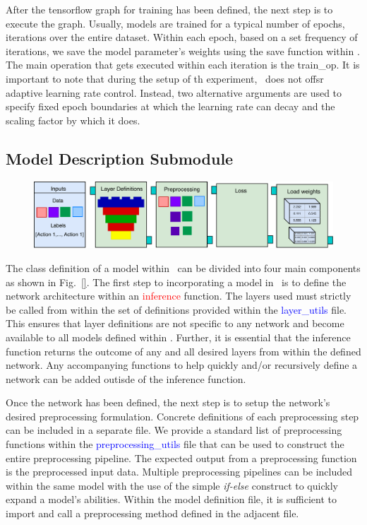 \documentclass{llncs}
\begin{document}
After the tensorflow graph for training has been defined, the next step is to execute the graph. 
Usually, models are trained for a typical number of epochs, iterations over the entire dataset.
Within each epoch, based on a set frequency of iterations, we save the model parameter's weights using the save function within \checkpoint.
The main operation that gets executed within each iteration is the train\_op.
It is important to note that during the setup of th experiment, \acro~does not offsr adaptive learning rate control. Instead, two alternative arguments are used to specify fixed epoch boundaries at which the learning rate can decay and the scaling factor by which it does.

\subsection{Model Description Submodule}
\label{sec:modeldesc}
\begin{figure}[b!]
\centering
\includegraphics[width=\columnwidth]{images/model_submodule.pdf}
\caption{}
\label{fig:model_submodule}
\end{figure}

The class definition of a model within \acro~can be divided into four main components as shown in Fig.~\ref{}. 
The first step to incorporating a model in \acro~is to define the network architecture within an \textcolor{red}{inference} function.
The layers used must strictly be called from within the set of definitions provided within the \textcolor{blue}{layer\_utils} file.
This ensures that layer definitions are not specific to any network and become available to all models defined within \acro.
Further, it is essential that the inference function returns the outcome of any and all desired layers from within the defined network.
Any accompanying functions to help quickly and/or recursively define a network can be added outisde of the inference function.

Once the network has been defined, the next step is to setup the network's desired preprocessing formulation.
Concrete definitions of each preprocessing step can be included in a separate file.
We provide a standard list of preprocessing functions within the \textcolor{blue}{preprocessing\_utils} file that can be used to construct the entire preprocessing pipeline.
The expected output from a preprocessing function is the preprocessed input data.
Multiple preprocessing pipelines can be included within the same model with the use of the simple \textit{if-else} construct to quickly expand a model's abilities. 
Within the model definition file, it is sufficient to import and call a preprocessing method defined in the adjacent file.
\end{document}
